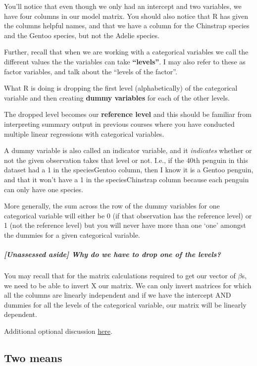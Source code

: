 \documentclass[
  openany]{book}
\begin{document}
You'll notice that even though we only had an intercept and two variables, we have four columns in our model matrix. You should also notice that R has given the columns helpful names, and that we have a column for the Chinstrap species and the Gentoo species, but not the Adelie species.

Further, recall that when we are working with a categorical variables we call the different values the the variables can take \textbf{``levels''}. I may also refer to these as factor variables, and talk about the ``levels of the factor''.

What R is doing is dropping the first level (alphabetically) of the categorical variable and then creating \textbf{dummy variables} for each of the other levels.

The dropped level becomes our \textbf{reference level} and this should be familiar from interpreting summary output in previous courses where you have conducted multiple linear regressions with categorical variables.

A dummy variable is also called an indicator variable, and it \emph{indicates} whether or not the given observation takes that level or not. I.e., if the 40th penguin in this dataset had a 1 in the speciesGentoo column, then I know it is a Gentoo penguin, and that it won't have a 1 in the speciesChinstrap column because each penguin can only have one species.

More generally, the sum across the row of the dummy variables for one categorical variable will either be 0 (if that observation has the reference level) or 1 (not the reference level) but you will never have more than one `one' amongst the dummies for a given categorical variable.

\hypertarget{unassessed-aside-why-do-we-have-to-drop-one-of-the-levels}{%
\subparagraph{{[}Unassessed aside{]} Why do we have to drop one of the levels?}\label{unassessed-aside-why-do-we-have-to-drop-one-of-the-levels}}

You may recall that for the matrix calculations required to get our vector of \(\beta\)s, we need to be able to invert X our matrix. We can only invert matrices for which all the columns are linearly independent and if we have the intercept AND dummies for all the levels of the categorical variable, our matrix will be linearly dependent.

Additional optional discussion \protect\hyperlink{matrices}{here}.

\hypertarget{two-means}{%
\subsection{Two means}\label{two-means}}
\end{document}
